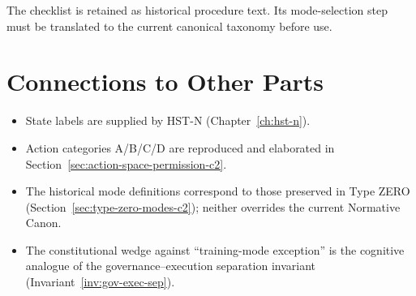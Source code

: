\noindent
The checklist is retained as historical procedure text. Its mode-selection
step must be translated to the current canonical taxonomy before use.

\section*{Connections to Other Parts}

\begin{itemize}
\item State labels are supplied by HST-N
(Chapter~\ref{ch:hst-n}).
\item Action categories A/B/C/D are reproduced and elaborated in
Section~\ref{sec:action-space-permission-c2}.
\item The historical mode definitions correspond to those preserved in
Type ZERO (Section~\ref{sec:type-zero-modes-c2}); neither overrides the
current Normative Canon.
\item The constitutional wedge against ``training-mode exception''
is the cognitive analogue of the governance--execution separation
invariant (Invariant~\ref{inv:gov-exec-sep}).
\end{itemize}
